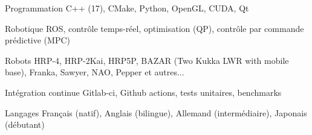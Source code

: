 

\begin{cvskills}

  \cvskill
    {Programmation} %
    {C++ (17), CMake, Python, OpenGL, CUDA, Qt} %

  \cvskill
    {Robotique} %
    {ROS, contrôle temps-réel, optimisation (QP), contrôle par commande prédictive (MPC)} %

  \cvskill
    {Robots} %
    {HRP-4, HRP-2Kai, HRP5P, BAZAR (Two Kukka LWR with mobile base), Franka, Sawyer, NAO, Pepper et autres...} %

  \cvskill
    {Intégration continue} %
    {Gitlab-ci, Github actions, tests unitaires, benchmarks} %

  \cvskill
    {Langages} %
    {Français (natif), Anglais (bilingue), Allemand (intermédiaire), Japonais (débutant)} %

\end{cvskills}

